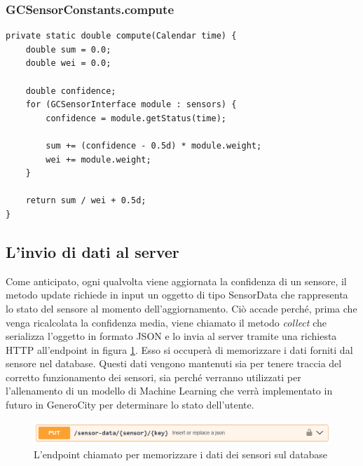 \subsubsection{GCSensorConstants.compute}
\begin{verbatim}
private static double compute(Calendar time) {
    double sum = 0.0;
    double wei = 0.0;

    double confidence;
    for (GCSensorInterface module : sensors) {
        confidence = module.getStatus(time);

        sum += (confidence - 0.5d) * module.weight;
        wei += module.weight;
    }

    return sum / wei + 0.5d;
}
\end{verbatim}

\subsection{L'invio di dati al server}\label{chap:sensorData}
Come anticipato, ogni qualvolta viene aggiornata la confidenza di un sensore, il metodo update richiede in input un oggetto di tipo SensorData che rappresenta lo stato del sensore al momento dell'aggiornamento. Ciò accade perché, prima che venga ricalcolata la confidenza media, viene chiamato il metodo \textit{collect} che serializza l'oggetto in formato JSON e lo invia al server tramite una richiesta HTTP all'endpoint in figura \ref{fig:endpoint}. Esso si occuperà di memorizzare i dati forniti dal sensore nel database. Questi dati vengono mantenuti sia per tenere traccia del corretto funzionamento dei sensori, sia perché verranno utilizzati per l'allenamento di un modello di Machine Learning che verrà implementato in futuro in GeneroCity per determinare lo stato dell'utente.

\begin{figure}[h]
    \centering
    \includegraphics[width=1\linewidth]{images/endpoint.png}
    \caption{L'endpoint chiamato per memorizzare i dati dei sensori sul database}
    \label{fig:endpoint}
\end{figure}

